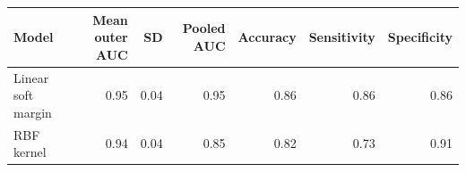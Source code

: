 \begin{tabular}{lrrrrrr}
\toprule
Model & Mean outer AUC & SD & Pooled AUC & Accuracy & Sensitivity & Specificity \\
\midrule
Linear soft margin & 0.95 & 0.04 & 0.95 & 0.86 & 0.86 & 0.86 \\
RBF kernel & 0.94 & 0.04 & 0.85 & 0.82 & 0.73 & 0.91 \\
\bottomrule
\end{tabular}
